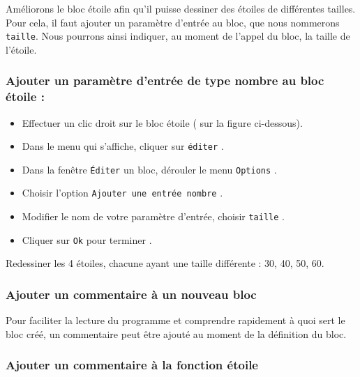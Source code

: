 Améliorons le bloc étoile afin qu’il puisse dessiner des étoiles de différentes tailles. Pour cela, il faut ajouter un paramètre d’entrée au bloc, que nous nommerons \texttt{taille}. Nous pourrons ainsi indiquer, au moment de l’appel du bloc, la taille de l’étoile.

\subsubsection{Ajouter un paramètre d’entrée de type nombre au bloc étoile :}

\begin{itemize}
\item Effectuer un clic droit sur le bloc étoile ( sur la figure ci-dessous).
\item Dans le menu qui s’affiche, cliquer sur \texttt{éditer} .
\item Dans la fenêtre \texttt{Éditer} un bloc, dérouler le menu \texttt{Options} .
\item Choisir l’option \texttt{Ajouter une entrée nombre} .
\item Modifier le nom de votre paramètre d’entrée, choisir \texttt{taille} .
\item Cliquer sur \texttt{Ok} pour terminer .
\end{itemize}


\vspace{12pt}

Redessiner les 4 étoiles, chacune ayant une taille différente : 30, 40, 50, 60.

\vspace{12pt}

\subsubsection{Ajouter un commentaire à un nouveau bloc}

Pour faciliter la lecture du programme et comprendre rapidement à quoi sert le bloc créé, un commentaire peut être ajouté au moment de la définition du bloc.

\subsubsection{Ajouter un commentaire à la fonction étoile}

